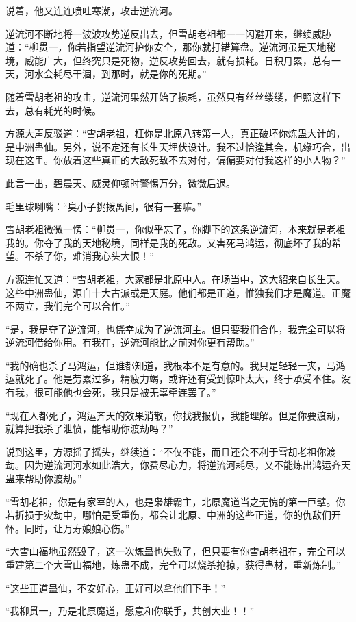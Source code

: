 \begin{this_body}
说着，他又连连喷吐寒潮，攻击逆流河。

逆流河不断地将一波波攻势逆反出去，但雪胡老祖都一一闪避开来，继续威胁道：“柳贯一，你若指望逆流河护你安全，那你就打错算盘。逆流河虽是天地秘境，威能广大，但终究只是死物，逆反攻势回去，就有损耗。日积月累，总有一天，河水会耗尽干涸，到那时，就是你的死期。”

随着雪胡老祖的攻击，逆流河果然开始了损耗，虽然只有丝丝缕缕，但照这样下去，总有耗光的时候。

方源大声反驳道：“雪胡老祖，枉你是北原八转第一人，真正破坏你炼蛊大计的，是中洲蛊仙。另外，说不定还有长生天埋伏设计。我不过恰逢其会，机缘巧合，出现在这里。你放着这些真正的大敌死敌不去对付，偏偏要对付我这样的小人物？”

此言一出，碧晨天、威灵仰顿时警惕万分，微微后退。

毛里球咧嘴：“臭小子挑拨离间，很有一套嘛。”

雪胡老祖微微一愣：“柳贯一，你似乎忘了，你脚下的这条逆流河，本来就是老祖我的。你夺了我的天地秘境，同样是我的死敌。又害死马鸿运，彻底坏了我的希望。不杀了你，难消我心头大恨！”

方源连忙又道：“雪胡老祖，大家都是北原中人。在场当中，这大貂来自长生天。这些中洲蛊仙，源自十大古派或是天庭。他们都是正道，惟独我们才是魔道。正魔不两立，我们完全可以合作。”

“是，我是夺了逆流河，也侥幸成为了逆流河主。但只要我们合作，我完全可以将逆流河借给你用。有我在，逆流河能比之前对你更有帮助。”

“我的确也杀了马鸿运，但谁都知道，我根本不是有意的。我只是轻轻一夹，马鸿运就死了。他是劳累过多，精疲力竭，或许还有受到惊吓太大，终于承受不住。没有我，很可能他也会死，我只是被无辜牵连罢了。”

“现在人都死了，鸿运齐天的效果消散，你找我报仇，我能理解。但是你要渡劫，就算把我杀了泄愤，能帮助你渡劫吗？”

说到这里，方源摇了摇头，继续道：“不仅不能，而且还会不利于雪胡老祖你渡劫。因为逆流河河水如此浩大，你费尽心力，将逆流河耗尽，又不能炼出鸿运齐天蛊来帮助你渡劫。”

“雪胡老祖，你是有家室的人，也是枭雄霸主，北原魔道当之无愧的第一巨擘。你若折损于灾劫中，哪怕是受重伤，都会让北原、中洲的这些正道，你的仇敌们开怀。同时，让万寿娘娘心伤。”

“大雪山福地虽然毁了，这一次炼蛊也失败了，但只要有你雪胡老祖在，完全可以重建第二个大雪山福地，炼蛊不成，完全可以烧杀抢掠，获得蛊材，重新炼制。”

“这些正道蛊仙，不安好心，正好可以拿他们下手！”

“我柳贯一，乃是北原魔道，愿意和你联手，共创大业！！”


\end{this_body}
